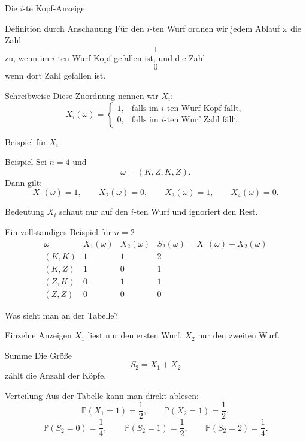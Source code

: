 \documentclass{beamer}
\begin{document}
\begin{frame}{Die \(i\)-te Kopf-Anzeige}
\begin{block}{Definition durch Anschauung}
Für den \(i\)-ten Wurf ordnen wir jedem Ablauf \(\omega\) die Zahl
\[
1
\]
zu, wenn im \(i\)-ten Wurf Kopf gefallen ist, und die Zahl
\[
0
\]
wenn dort Zahl gefallen ist.
\end{block}

\begin{block}{Schreibweise}
Diese Zuordnung nennen wir \(X_i\):
\[
X_i(\omega)=
\begin{cases}
1,& \text{falls im \(i\)-ten Wurf Kopf fällt},\\
0,& \text{falls im \(i\)-ten Wurf Zahl fällt}.
\end{cases}
\]
\end{block}
\end{frame}

\begin{frame}{Beispiel für \(X_i\)}
\begin{block}{Beispiel}
Sei \(n=4\) und
\[
\omega=(K,Z,K,Z).
\]
Dann gilt:
\[
X_1(\omega)=1,\qquad X_2(\omega)=0,\qquad X_3(\omega)=1,\qquad X_4(\omega)=0.
\]
\end{block}

\begin{block}{Bedeutung}
\(X_i\) schaut nur auf den \(i\)-ten Wurf und ignoriert den Rest.
\end{block}
\end{frame}

\begin{frame}{Ein vollständiges Beispiel für \(n=2\)}
\[
\begin{array}{c|c|c|c}
\omega & X_1(\omega) & X_2(\omega) & S_2(\omega)=X_1(\omega)+X_2(\omega)\\
\hline
(K,K) & 1 & 1 & 2\\
(K,Z) & 1 & 0 & 1\\
(Z,K) & 0 & 1 & 1\\
(Z,Z) & 0 & 0 & 0
\end{array}
\]
\end{frame}

\begin{frame}{Was sieht man an der Tabelle?}
\begin{block}{Einzelne Anzeigen}
\(X_1\) liest nur den ersten Wurf, \(X_2\) nur den zweiten Wurf.
\end{block}

\begin{block}{Summe}
Die Größe
\[
S_2=X_1+X_2
\]
zählt die Anzahl der Köpfe.
\end{block}

\begin{block}{Verteilung}
Aus der Tabelle kann man direkt ablesen:
\[
\mathbb P(X_1=1)=\frac12,\qquad \mathbb P(X_2=1)=\frac12,
\]
\[
\mathbb P(S_2=0)=\frac14,\qquad
\mathbb P(S_2=1)=\frac12,\qquad
\mathbb P(S_2=2)=\frac14.
\]
\end{block}
\end{frame}
\end{document}

